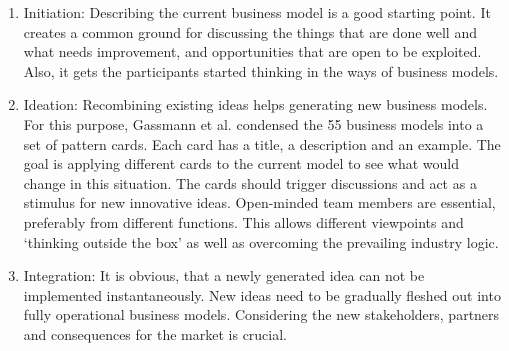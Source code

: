 		\begin{enumerate}
			\item Initiation: Describing the current business model is a good starting point. It creates a common ground for discussing the things that are done well and what needs improvement, and opportunities that are open to be exploited. Also, it gets the participants started thinking in the ways of business models.
			\item Ideation: Recombining existing ideas helps generating new business models. For this purpose, Gassmann et al. condensed the 55 business models into a set of pattern cards. Each card has a title, a description and an example. The goal is applying different cards to the current model to see what would change in this situation. The cards should trigger discussions and act as a stimulus for new innovative ideas. Open-minded team members are essential, preferably from different functions. This allows different viewpoints and `thinking outside the box' as well as overcoming the prevailing industry logic.
			\item Integration: It is obvious, that a newly generated idea can not be implemented instantaneously. New ideas need to be gradually fleshed out into fully operational business models. Considering the new stakeholders, partners and consequences for the market is crucial.
		\end{enumerate}
	\vspace{-1em}
